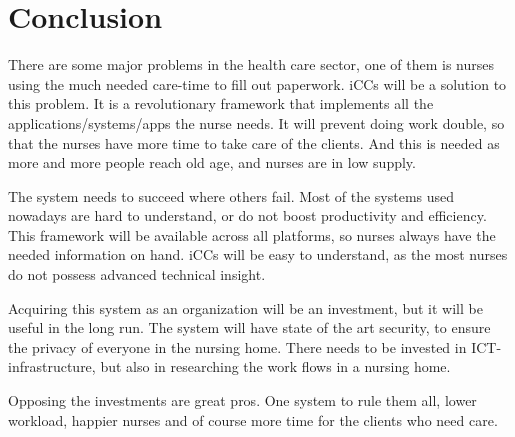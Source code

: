 \documentclass{report}
\begin{document}
{\chapter{Conclusion}
\thispagestyle{fancy}

There are some major problems in the health care sector, one of them is nurses using the much needed care-time to fill out paperwork. iCCs will be a solution to this problem. It is a revolutionary framework that implements all the applications/systems/apps the nurse needs. It will prevent doing work double, so that the nurses have more time to take care of the clients. And this is needed as more and more people reach old age, and nurses are in low supply. 

The system needs to succeed where others fail. Most of the systems used nowadays are hard to understand, or do not boost productivity and efficiency. This framework will be available across all platforms, so nurses always have the needed information on hand. iCCs will be easy to understand, as the most nurses do not possess advanced technical insight. 

Acquiring this system as an organization will be an investment, but it will be useful in the long run. The system will have state of the art security, to ensure the privacy of everyone in the nursing home. There needs to be invested in ICT-infrastructure, but also in researching the work flows in a nursing home. 

Opposing the investments are great pros. One system to rule them all, lower workload, happier nurses and of course more time for the clients who need care.
\vfill

}



\end{document}
